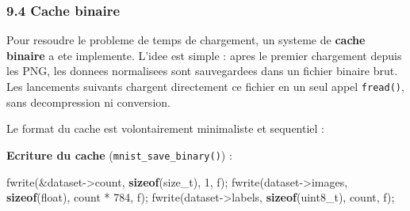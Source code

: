 \documentclass[
  letterpaper,
  DIV=11,
  numbers=noendperiod]{scrartcl}
\newenvironment{Shaded}{\begin{snugshade}}{\end{snugshade}}
\newcommand{\DataTypeTok}[1]{\textcolor[rgb]{0.68,0.00,0.00}{#1}}
\newcommand{\DecValTok}[1]{\textcolor[rgb]{0.68,0.00,0.00}{#1}}
\newcommand{\KeywordTok}[1]{\textcolor[rgb]{0.00,0.23,0.31}{\textbf{#1}}}
\newcommand{\NormalTok}[1]{\textcolor[rgb]{0.00,0.23,0.31}{#1}}
\newcommand{\OperatorTok}[1]{\textcolor[rgb]{0.37,0.37,0.37}{#1}}
\begin{document}
\subsubsection{9.4 Cache binaire}\label{cache-binaire}

Pour resoudre le probleme de temps de chargement, un systeme de \textbf{cache binaire} a ete implemente. L'idee est simple : apres le premier chargement depuis les PNG, les donnees normalisees sont sauvegardees dans un fichier binaire brut. Les lancements suivants chargent directement ce fichier en un seul appel \texttt{fread()}, sans decompression ni conversion.

Le format du cache est volontairement minimaliste et sequentiel :

\begin{center}
\end{center}

\textbf{Ecriture du cache} (\texttt{mnist\_save\_binary()}) :
\begin{Shaded}
\begin{Highlighting}[]
\NormalTok{fwrite}\OperatorTok{(\&}\NormalTok{dataset}\OperatorTok{{-}\textgreater{}}\NormalTok{count}\OperatorTok{,} \KeywordTok{sizeof}\OperatorTok{(}\NormalTok{size\_t}\OperatorTok{),} \DecValTok{1}\OperatorTok{,}\NormalTok{ f}\OperatorTok{);}
\NormalTok{fwrite}\OperatorTok{(}\NormalTok{dataset}\OperatorTok{{-}\textgreater{}}\NormalTok{images}\OperatorTok{,} \KeywordTok{sizeof}\OperatorTok{(}\DataTypeTok{float}\OperatorTok{),}\NormalTok{ count }\OperatorTok{*} \DecValTok{784}\OperatorTok{,}\NormalTok{ f}\OperatorTok{);}
\NormalTok{fwrite}\OperatorTok{(}\NormalTok{dataset}\OperatorTok{{-}\textgreater{}}\NormalTok{labels}\OperatorTok{,} \KeywordTok{sizeof}\OperatorTok{(}\NormalTok{uint8\_t}\OperatorTok{),}\NormalTok{ count}\OperatorTok{,}\NormalTok{ f}\OperatorTok{);}
\end{Highlighting}
\end{Shaded}
\end{document}
